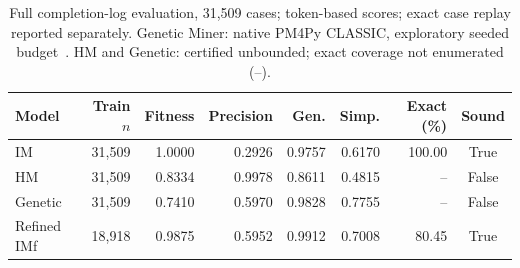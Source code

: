 \begin{table}[h!]
\centering
\small
\begin{tabular}{lrrrrrrc}
\hline
Model & Train $n$ & Fitness & Precision & Gen. & Simp. & Exact (\%) & Sound \\
\hline
IM & 31,509 & 1.0000 & 0.2926 & 0.9757 & 0.6170 & 100.00 & True \\
HM & 31,509 & 0.8334 & 0.9978 & 0.8611 & 0.4815 & -- & False \\
Genetic & 31,509 & 0.7410 & 0.5970 & 0.9828 & 0.7755 & -- & False \\
Refined IMf & 18,918 & 0.9875 & 0.5952 & 0.9912 & 0.7008 & 80.45 & True \\
\hline
\end{tabular}
\caption{Full completion-log evaluation, 31,509 cases; token-based scores; exact case replay reported separately. Genetic Miner: native PM4Py CLASSIC, exploratory seeded budget~\cite{vdaalst2005genetic}. HM and Genetic: certified unbounded; exact coverage not enumerated (--).}
\end{table}
